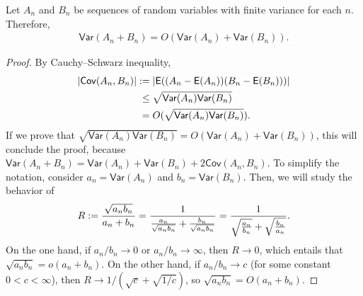 \documentclass[oneside,11pt]{article}
\begin{document}
\begin{lemma}\label{lemma-sum-variances}
    Let $A_n$ and $B_n$ be sequences of random variables with finite variance for each $n$. Therefore,
    \begin{align*}
        \mathsf{Var}(A_n + B_n) = O(\mathsf{Var}(A_n)+\mathsf{Var}(B_n)).
    \end{align*}
\end{lemma}
\begin{proof}
    By Cauchy–Schwarz inequality,
    \begin{align*}
        |\mathsf{Cov}(A_n, B_n)| :=&\;  |\mathsf{E} ((A_n -\mathsf{E}(A_n))(B_n -\mathsf{E}(B_n)))| \\
        \le&\; \sqrt{\mathsf{Var}(A_n) \mathsf{Var}(B_n)} \\
        =&\; O(\sqrt{\mathsf{Var}(A_n) \mathsf{Var}(B_n)}).
    \end{align*}
If we prove that $\sqrt{\mathsf{Var}(A_n) \mathsf{Var}(B_n)} = O(\mathsf{Var}(A_n) + \mathsf{Var}(B_n))$, this will conclude the proof, because $\mathsf{Var}(A_n + B_n) = \mathsf{Var}(A_n) + \mathsf{Var}(B_n) + 2 \mathsf{Cov}(A_n, B_n)$. To simplify the notation, consider $a_n = \mathsf{Var}(A_n)$ and $b_n = \mathsf{Var}(B_n)$. Then, we will study the behavior of
\begin{align*}
    R := \frac{\sqrt{a_n b_n}}{a_n + b_n}
    = \frac{1}{\frac{a_n}{\sqrt{a_n b_n}} + \frac{b_n}{\sqrt{a_n b_n}}}
    = \frac{1}{\sqrt{\frac{a_n}{b_n}} + \sqrt{\frac{b_n}{a_n}}}.
\end{align*}
On the one hand, if $a_n / b_n \to 0$ or $a_n / b_n \to \infty$, then $R \to 0$, which entails that $\sqrt{a_n b_n} = o(a_n + b_n)$. On the other hand, if $a_n/b_n \to c$ (for some constant $0 < c < \infty$), then $R \to 1/(\sqrt{c} + \sqrt{1/c})$, so $\sqrt{a_n b_n} = O(a_n + b_n)$.
\end{proof}
\end{document}
